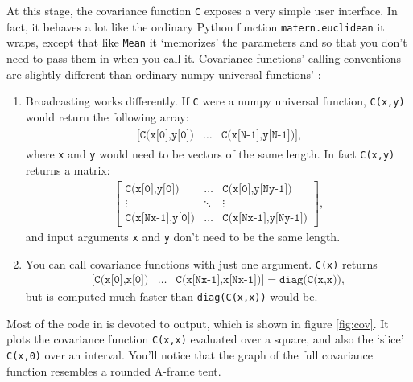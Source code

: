 \documentclass{manual}
\begin{document}
At this stage, the covariance function \texttt{C} exposes a very simple user interface. In fact, it behaves a lot like the ordinary Python function \texttt{matern.euclidean} it wraps, except that like \texttt{Mean} it `memorizes' the parameters  and  so that you don't need to pass them in when you call it. Covariance functions' calling conventions are slightly different than ordinary numpy universal functions' \cite{numpybook}:
\begin{enumerate}
    \item Broadcasting works differently. If \texttt{C} were a numpy universal function, \texttt{C(x,y)} would return the following array:
    \begin{eqnarray*}
        \begin{array}{ccc}
            \texttt{[C(x[0],y[0])}& \ldots& \texttt{C(x[N-1],y[N-1])]},
        \end{array}
    \end{eqnarray*}
    where \texttt{x} and \texttt{y} would need to be vectors of the same length. In fact \texttt{C(x,y)} returns a matrix:
    \begin{eqnarray*}
        \left[\begin{array}{ccc}
            \texttt{C(x[0],y[0])}& \ldots& \texttt{C(x[0],y[Ny-1])}\\
            \vdots&\ddots&\vdots\\
            \texttt{C(x[Nx-1],y[0])}& \ldots& \texttt{C(x[Nx-1],y[Ny-1])}
        \end{array}\right],
    \end{eqnarray*}
    and input arguments \texttt{x} and \texttt{y} don't need to be the same length.
    \item You can call covariance functions with just one argument. \texttt{C(x)} returns
    \begin{eqnarray*}
         \texttt{[C(x[0],x[0])}& \ldots& \texttt{C(x[Nx-1],x[Nx-1])]} = \texttt{diag(C(x,x))},
    \end{eqnarray*}
    but is computed much faster than \texttt{diag(C(x,x))} would be.
\end{enumerate}

Most of the code in  is devoted to output, which is shown in figure \ref{fig:cov}. It plots the covariance function \texttt{C(x,x)} evaluated over a square, and also the `slice' \texttt{C(x,0)} over an interval. You'll notice that the graph of the full covariance function resembles a rounded A-frame tent.
\end{document}
